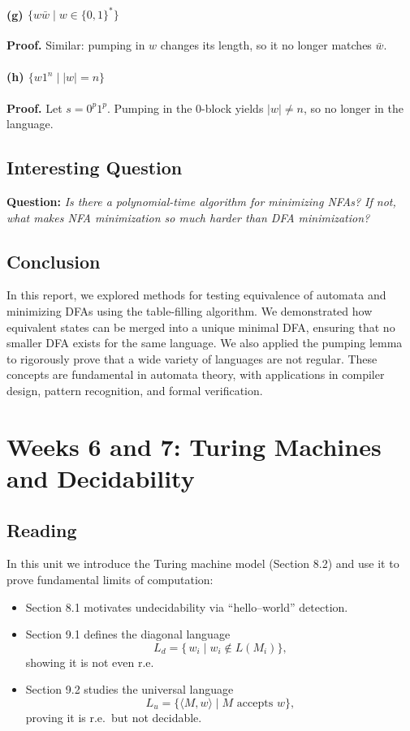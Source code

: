\documentclass{article}
\theoremstyle{theorem}
\theoremstyle{definition}
\theoremstyle{remark}
\begin{document}
\paragraph{(g) \(\{w\bar w\mid w\in\{0,1\}^*\}\)}
\textbf{Proof.} Similar: pumping in \(w\) changes its length, so it no longer matches \(\bar w\).

\paragraph{(h) \(\{w1^n\mid |w|=n\}\)}
\textbf{Proof.} Let \(s=0^p1^p\). Pumping in the 0-block yields \(|w|\neq n\), so no longer in the language.

\subsection{Interesting Question}
\textbf{Question:}  
\emph{Is there a polynomial-time algorithm for minimizing NFAs? If not, what makes NFA minimization so much harder than DFA minimization?}

\subsection{Conclusion}
In this report, we explored methods for testing equivalence of automata and minimizing DFAs using the table-filling algorithm. We demonstrated how equivalent states can be merged into a unique minimal DFA, ensuring that no smaller DFA exists for the same language. We also applied the pumping lemma to rigorously prove that a wide variety of languages are not regular. These concepts are fundamental in automata theory, with applications in compiler design, pattern recognition, and formal verification.

\newpage

\section{Weeks 6 and 7: Turing Machines and Decidability}

\subsection*{Reading}

In this unit we introduce the Turing machine model (Section 8.2) and use it to prove fundamental limits of computation:  
\begin{itemize}
  \item Section 8.1 motivates undecidability via “hello–world” detection.  
  \item Section 9.1 defines the diagonal language 
    \[
      L_{d} = \{\,w_i \mid w_i \notin L(M_i)\},
    \]
    showing it is not even r.e.  
  \item Section 9.2 studies the universal language 
    \[
      L_{u} = \{\langle M,w\rangle \mid M\text{ accepts }w\},
    \]
    proving it is r.e.\ but not decidable.  
\end{itemize}
\end{document}
